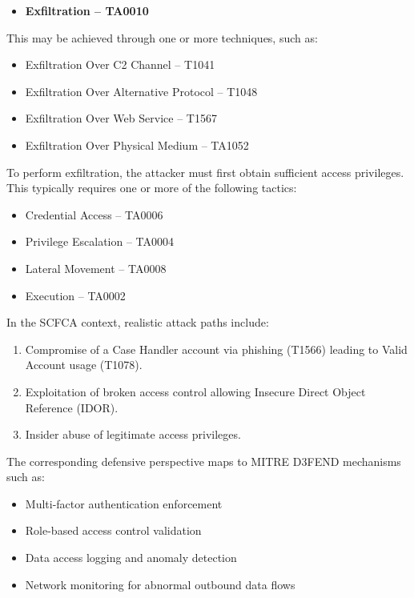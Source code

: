 \documentclass[12pt,a4paper]{report}
\begin{document}
\begin{itemize}
    \item \textbf{Exfiltration – TA0010}
\end{itemize}

This may be achieved through one or more techniques, such as:

\begin{itemize}
    \item Exfiltration Over C2 Channel – T1041
    \item Exfiltration Over Alternative Protocol – T1048
    \item Exfiltration Over Web Service – T1567
     \item Exfiltration Over Physical Medium – TA1052
\end{itemize}

To perform exfiltration, the attacker must first obtain sufficient access privileges. This typically requires one or more of the following tactics:

\begin{itemize}
    \item Credential Access – TA0006
    \item Privilege Escalation – TA0004
    \item Lateral Movement – TA0008
    \item Execution – TA0002
\end{itemize}

In the SCFCA context, realistic attack paths include:

\begin{enumerate}
    \item Compromise of a Case Handler account via phishing (T1566) leading to Valid Account usage (T1078).
    \item Exploitation of broken access control allowing Insecure Direct Object Reference (IDOR).
    \item Insider abuse of legitimate access privileges.
\end{enumerate}

The corresponding defensive perspective maps to MITRE D3FEND mechanisms such as:

\begin{itemize}
    \item Multi-factor authentication enforcement
    \item Role-based access control validation
    \item Data access logging and anomaly detection
    \item Network monitoring for abnormal outbound data flows
\end{itemize}
\end{document}
